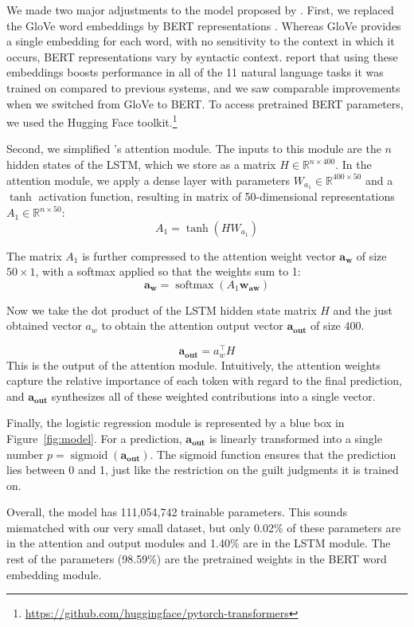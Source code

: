 \documentclass[11pt,a4paper]{article}
\DeclareMathOperator{\softmax}{softmax}
\DeclareMathOperator{\sigmoid}{sigmoid}
\newcommand{\aout}{\mathbf{a_{\text{out}}}}
\begin{document}
We made two major adjustments to the model proposed by \citeauthor{Lin:2017}. First, we replaced the GloVe word embeddings \citep{Pennington:2014} by BERT representations \citep{Devlin:2018}. Whereas GloVe provides a single embedding for each word, with no sensitivity to the context in which it occurs, BERT representations vary by syntactic context. \citeauthor{Devlin:2018} report that using these embeddings boosts performance in all of the 11 natural language tasks it was trained on compared to previous systems, and we saw comparable improvements when we switched from GloVe to BERT. To access pretrained BERT parameters, we used the Hugging Face toolkit.\footnote{\url{https://github.com/huggingface/pytorch-transformers}}

Second, we simplified \citeauthor{Lin:2017}'s attention module. The inputs to this module are the $n$ hidden states of the LSTM, which we store as a matrix $H \in \mathbb{R}^{n \times 400}$. In the attention module, we apply a dense layer with parameters $W_{a_{1}} \in \mathbb{R}^{400 \times 50}$ and a $\tanh$ activation function, resulting in matrix of 50-dimensional representations $A_{1} \in \mathbb{R}^{n \times 50}$:
\[
  A_{1} = \tanh(HW_{a_{1}})
\]

The matrix $A_1$ is further compressed to the attention weight vector $\mathbf{a_w}$ of size $50 \times 1$, with a softmax applied so that the weights sum to 1:
\[
  \mathbf{a_w} = \softmax(A_{1}\mathbf{w_{aw}})
\]

Now we take the dot product of the LSTM hidden state matrix $H$ and the just obtained vector $a_w$ to obtain the attention output vector $\aout$ of size $400$. 

\[
  \aout = a_{w}^{\top} H
\]
This is the output of the attention module. Intuitively, the attention weights capture the relative importance of each token with regard to the final prediction, and $\aout$ synthesizes all of these weighted contributions into a single vector.

Finally, the logistic regression module is represented by a blue box in Figure~\ref{fig:model}.  For a prediction, $\aout$ is linearly transformed into a single number $p = \sigmoid(\aout)$. The sigmoid function ensures that the prediction lies between 0 and 1, just like the restriction on the guilt judgments it is trained on.

Overall, the model has 111,054,742 trainable parameters. This sounds mismatched with our very small dataset, but only 0.02\% of these parameters are in the attention and output modules and 1.40\% are in the LSTM module. The rest of the parameters (98.59\%) are the pretrained weights in the BERT word embedding module.
\end{document}
